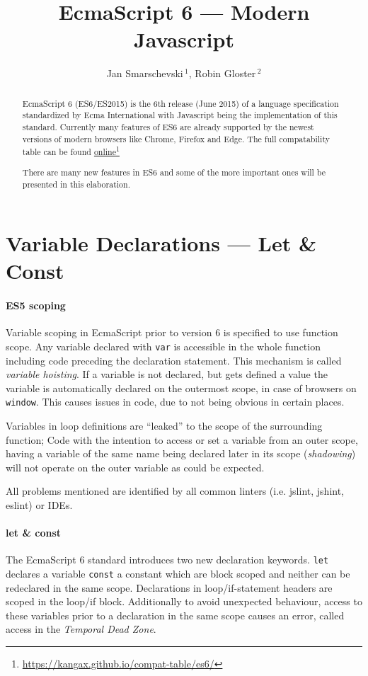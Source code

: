 \documentclass{bioinfo}
\newcommand\fnurl[2]{%
  \href{#1}{#2}\footnote{\url{#1}}%
}
\begin{document}
\title[EcmaScript 6]{EcmaScript 6 --- Modern Javascript}
\author[Smarschevski, Gloster]{Jan Smarschevski\,$^{1}$, Robin Gloster\,$^{2}$}
\address{$^{1}$jan.smarschevski@tum.de\\
$^{2}$robin.gloster@tum.de}

\maketitle

\begin{abstract}
EcmaScript 6 (ES6/ES2015) is the 6th release (June 2015) of a language
specification standardized by Ecma International with Javascript being
the implementation of this standard. Currently many features of ES6
are already supported by the newest versions of modern browsers like Chrome,
Firefox and Edge. The full compatability table can be found
\fnurl{https://kangax.github.io/compat-table/es6/}{online}
There are many new features in ES6 and some of the more important ones will
be presented in this elaboration.
\end{abstract}

\section{Variable Declarations --- Let \& Const}
\paragraph{ES5 scoping\textcolon}
Variable scoping in EcmaScript prior to version 6 is specified to use function scope.
Any variable declared with {\tt var} is accessible in the whole function including
code preceding the declaration statement. This mechanism is called {\em variable hoisting}.
If a variable is not declared, but gets defined a value the variable is automatically declared
on the outermost scope, in case of browsers on {\tt window}. This causes issues in code, due
to not being obvious in certain places.

Variables in loop definitions are ``leaked'' to the scope of the surrounding function; Code
with the intention to access or set a variable from an outer scope, having a variable of
the same name being declared later in its scope ({\em shadowing}) will not operate on the
outer variable as could be expected.

All problems mentioned are identified by all common linters (i.e. jslint, jshint, eslint)
or IDEs.


\paragraph{let \& const\textcolon}
The EcmaScript 6 standard introduces two new declaration keywords. {\tt let} declares
a variable {\tt const} a constant which are block scoped and neither can be redeclared
in the same scope. Declarations in loop/if-statement headers are scoped in the loop/if
block. Additionally to avoid unexpected behaviour, access to these variables prior
to a declaration in the same scope causes an error, called access in
the {\em Temporal Dead Zone}.
\end{document}
